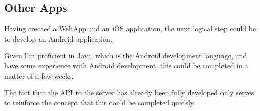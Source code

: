 \documentclass[12pt]{article}
\begin{document}
\subsection{Other Apps}

Having created a WebApp and an iOS application, the next logical step could be to develop an Android application. 

Given I'm proficient in Java, which is the Android development language, and have some experience with Android development, this could be completed in a matter of a few weeks. 

The fact that the API to the server has already been fully developed only serves to reinforce the concept that this could be completed quickly. 


\newpage

\printbibliography[heading=bibintoc]


\newpage
\end{document}
